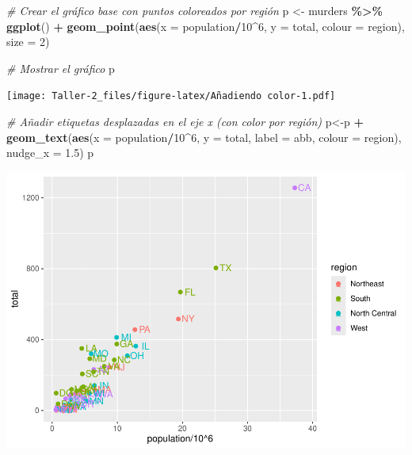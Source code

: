 \documentclass[
]{article}
\newenvironment{Shaded}{\begin{snugshade}}{\end{snugshade}}
\newcommand{\AttributeTok}[1]{\textcolor[rgb]{0.13,0.29,0.53}{#1}}
\newcommand{\CommentTok}[1]{\textcolor[rgb]{0.56,0.35,0.01}{\textit{#1}}}
\newcommand{\DecValTok}[1]{\textcolor[rgb]{0.00,0.00,0.81}{#1}}
\newcommand{\FloatTok}[1]{\textcolor[rgb]{0.00,0.00,0.81}{#1}}
\newcommand{\FunctionTok}[1]{\textcolor[rgb]{0.13,0.29,0.53}{\textbf{#1}}}
\newcommand{\NormalTok}[1]{#1}
\newcommand{\OtherTok}[1]{\textcolor[rgb]{0.56,0.35,0.01}{#1}}
\newcommand{\SpecialCharTok}[1]{\textcolor[rgb]{0.81,0.36,0.00}{\textbf{#1}}}
\begin{document}
\begin{Shaded}
\begin{Highlighting}[]
\CommentTok{\# Crear el gráfico base con puntos coloreados por región}
\NormalTok{p }\OtherTok{\textless{}{-}}\NormalTok{ murders }\SpecialCharTok{\%\textgreater{}\%}
  \FunctionTok{ggplot}\NormalTok{() }\SpecialCharTok{+}
  \FunctionTok{geom\_point}\NormalTok{(}\FunctionTok{aes}\NormalTok{(}\AttributeTok{x =}\NormalTok{ population}\SpecialCharTok{/}\DecValTok{10}\SpecialCharTok{\^{}}\DecValTok{6}\NormalTok{, }\AttributeTok{y =}\NormalTok{ total, }\AttributeTok{colour =}\NormalTok{ region), }\AttributeTok{size =} \DecValTok{2}\NormalTok{)}

\CommentTok{\# Mostrar el gráfico}
\NormalTok{p}
\end{Highlighting}
\end{Shaded}

\texttt{[image: Taller-2\_files/figure-latex/Añadiendo color-1.pdf]}

\begin{Shaded}
\begin{Highlighting}[]
\CommentTok{\# Añadir etiquetas desplazadas en el eje x (con color por región)}
\NormalTok{p}\OtherTok{\textless{}{-}}\NormalTok{p }\SpecialCharTok{+} 
  \FunctionTok{geom\_text}\NormalTok{(}\FunctionTok{aes}\NormalTok{(}\AttributeTok{x =}\NormalTok{ population}\SpecialCharTok{/}\DecValTok{10}\SpecialCharTok{\^{}}\DecValTok{6}\NormalTok{, }\AttributeTok{y =}\NormalTok{ total, }\AttributeTok{label =}\NormalTok{ abb, }\AttributeTok{colour =}\NormalTok{ region), }\AttributeTok{nudge\_x =} \FloatTok{1.5}\NormalTok{)}
\NormalTok{p}
\end{Highlighting}
\end{Shaded}

\includegraphics{Taller-2_files/figure-latex/Añadiendo nuevamente etiquetas de abreviación jurisdiccional-1.pdf}
\end{document}
